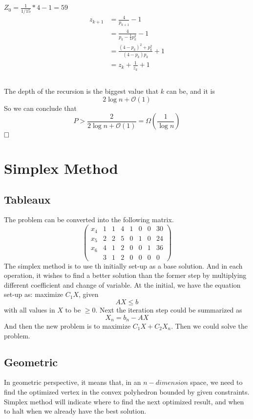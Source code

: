 \documentclass{article}
\newcommand{\qedhere}{$\hfill\ensuremath{\square}$}
\begin{document}
\subsection{}
\par $Z_0 = \frac{1}{1/15}*4-1 = 59$ 
\begin{align*}
z_{k+1} &= \frac{4}{p_{k+1}}-1 \\
&= \frac{4}{p_k- \frac{1}{4}p_k^2}-1 \\
&=\frac{(4-p_k)^2+p_k^2}{(4-p_k)p_k}+1\\
&= z_k + \frac{1}{z_k} +1
\end{align*}

\subsection{}
The depth of the recursion is the biggest value that $k$ can be, and it is 
\[
	2 \log n+ \mathcal{O}(1)
\]
So we can conclude that 
\[
	P > \frac{2}{2 \log n+ \mathcal{O}(1)} = \Omega (\frac{1}{\log n})
\]		
\qedhere
\section{Simplex Method}
\subsection{Tableaux}
The problem can be converted into the following matrix.
\[
	\begin{pmatrix}
	x_4 & 1 & 1 & 4 & 1 & 0 & 0 & 30\\
	x_5 & 2 & 2 & 5 & 0 & 1 & 0 & 24\\
	x_6 & 4 & 1 & 2 & 0 & 0 & 1 & 36 \\
		& 3 & 1 & 2 & 0 & 0 & 0 & 0 
	\end{pmatrix}
\]
The simplex method is to use th initially set-up as a base solution. And in each operation, it wishes to find a better solution than the former step by multiplying different coefficient and change of variable. At the initial, we have the equation set-up as: maximize $C_1X$, given
\[
	AX \leq b
\]
with all values in $X$ to be $\geq 0$. Next the iteration step could be summarized as 
\[
	X_n = b_n-AX
\]
And then the new problem is to maximize $C_1X+C_2X_n$. Then we could solve the problem.

\subsection{Geometric}
In geometric perspective, it means that, in an $n-dimension$ space, we need to find the optimized vertex in the convex polyhedron bounded by given constraints. Simplex method will indicate where to find the next optimized result, and when to halt when we already have the best solution.
\end{document}
